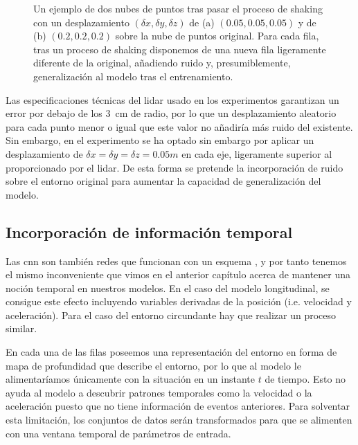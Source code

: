 \begin{figure}
	\centering
	\qquad
	\caption[Ejemplo de la técnica de \textit{shaking}]{Un ejemplo de dos nubes de puntos tras pasar el proceso de shaking con un desplazamiento $(\delta x, \delta y, \delta z)$ de (a) $(0.05, 0.05, 0.05)$ y de (b) $(0.2, 0.2, 0.2)$ sobre la nube de puntos original. Para cada fila, tras un proceso de shaking disponemos de una nueva fila ligeramente diferente de la original, añadiendo ruido y, presumiblemente, generalización al modelo tras el entrenamiento.}
	\label{fig:shaking-example}
\end{figure}

Las especificaciones técnicas del \acrshort{lidar} usado en los experimentos garantizan un error por debajo de los \SI{3}{\cm} de radio, por lo que un desplazamiento aleatorio para cada punto menor o igual que este valor no añadiría más ruido del existente. Sin embargo, en el experimento se ha optado sin embargo por aplicar un desplazamiento de $\delta x = \delta y = \delta z = 0.05m$ en cada eje, ligeramente superior al proporcionado por el \acrshort{lidar}. De esta forma se pretende la incorporación de ruido sobre el entorno original para aumentar la capacidad de generalización del modelo.

\subsection{Incorporación de información temporal}

Las \ac{cnn} son también redes que funcionan con un esquema \textit{}, y por tanto tenemos el mismo inconveniente que vimos en el anterior capítulo acerca de mantener una noción temporal en nuestros modelos. En el caso del modelo longitudinal, se consigue este efecto incluyendo variables derivadas de la posición (i.e. velocidad y aceleración). Para el caso del entorno circundante hay que realizar un proceso similar.

En cada una de las filas poseemos una representación del entorno en forma de mapa de profundidad que describe el entorno, por lo que al modelo le alimentaríamos únicamente con la situación en un instante $t$ de tiempo. Esto no ayuda al modelo a descubrir patrones temporales como la velocidad o la aceleración puesto que no tiene información de eventos anteriores. Para solventar esta limitación, los conjuntos de datos serán transformados para que se alimenten con una ventana temporal de parámetros de entrada.

